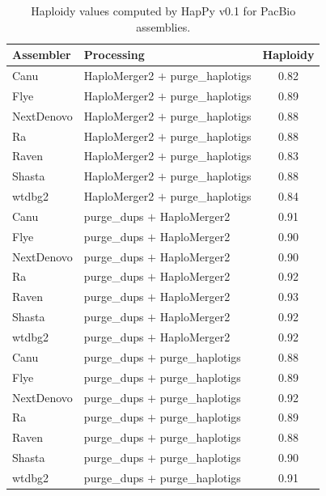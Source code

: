 \begin{table}[ht]
\centering
\caption{Haploidy values computed by HapPy v0.1 for PacBio assemblies.}
\begin{tabular}{llc}
\hline
\textbf{Assembler} & \textbf{Processing} & \textbf{Haploidy} \\
\hline
Canu & HaploMerger2 $+$ purge\_haplotigs & 0.82 \\
Flye & HaploMerger2 $+$ purge\_haplotigs & 0.89 \\
NextDenovo & HaploMerger2 $+$ purge\_haplotigs & 0.88 \\
Ra & HaploMerger2 $+$ purge\_haplotigs & 0.88 \\
Raven & HaploMerger2 $+$ purge\_haplotigs & 0.83 \\
Shasta & HaploMerger2 $+$ purge\_haplotigs & 0.88 \\
wtdbg2 & HaploMerger2 $+$ purge\_haplotigs & 0.84 \\
Canu & purge\_dups $+$ HaploMerger2 & 0.91 \\
Flye & purge\_dups $+$ HaploMerger2 & 0.90 \\
NextDenovo & purge\_dups $+$ HaploMerger2 & 0.90 \\
Ra & purge\_dups $+$ HaploMerger2 & 0.92 \\
Raven & purge\_dups $+$ HaploMerger2 & 0.93 \\
Shasta & purge\_dups $+$ HaploMerger2 & 0.92 \\
wtdbg2 & purge\_dups $+$ HaploMerger2 & 0.92 \\
Canu & purge\_dups $+$ purge\_haplotigs & 0.88 \\
Flye & purge\_dups $+$ purge\_haplotigs & 0.89 \\
NextDenovo & purge\_dups $+$ purge\_haplotigs & 0.92 \\
Ra & purge\_dups $+$ purge\_haplotigs & 0.89 \\
Raven & purge\_dups $+$ purge\_haplotigs & 0.88 \\
Shasta & purge\_dups $+$ purge\_haplotigs & 0.90 \\
wtdbg2 & purge\_dups $+$ purge\_haplotigs & 0.91 \\
\hline
\end{tabular}
\label{tab:pacbio_happy_part3}
\end{table}

